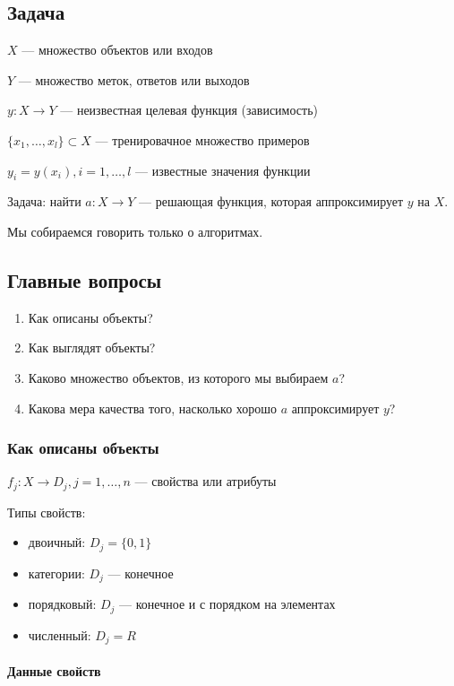 \documentclass[10pt,a4paper,oneside,titlepage]{report}
\theoremstyle{defenition}
\theoremstyle{theorem}
\begin{document}
\subsection{Задача}

$X$ --- множество объектов или входов

$Y$ --- множество меток, ответов или выходов

$y: X \to Y$ --- неизвестная целевая функция (зависимость)

$\{x_1, \dots , x_l\} \subset X$ --- тренировачное множество примеров

$y_i = y(x_i), i = 1, \dots , l$ --- известные значения функции

Задача: найти $a: X \to Y$ --- решающая функция, которая аппроксимирует $y$ на $X$.

Мы собираемся говорить только о алгоритмах.

\subsection{Главные вопросы}

\begin{enumerate}
	\item Как описаны объекты?
	\item Как выглядят объекты?
	\item Каково множество объектов, из которого мы выбираем $a$?
	\item Какова мера качества того, насколько хорошо $a$ аппроксимирует $y$?
\end{enumerate}

\subsubsection{Как описаны объекты}

$f_j: X \to D_j, j = 1, \ldots , n$ --- свойства или атрибуты

Типы свойств:
\begin{itemize}
	\item двоичный: $D_j = \{0, 1\}$
	\item категории: $D_j$ --- конечное
	\item порядковый: $D_j$ --- конечное и с порядком на элементах
	\item численный: $D_j = R$
\end{itemize}

\paragraph{Данные свойств}
\end{document}
